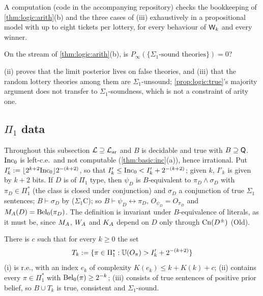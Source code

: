 A computation (code in the accompanying repository) checks the bookkeeping of \cref{thm:logic:arith}(b) and the three cases of (iii) exhaustively in a propositional model with up to eight tickets per lottery, for every behaviour of $\mathsf{W}_{k}$ and every winner.

\begin{question}\label{q:logic:soundtrue}
On the stream of \cref{thm:logic:arith}(b), is $P_\infty(\{\text{$\Sigma_1$-sound theories}\})=0$?
\end{question}

(ii) proves that the limit posterior lives on false theories, and (iii) that the random lottery theories among them are $\Sigma_1$-unsound; \cref{prop:logic:true}'s majority argument does not transfer to $\Sigma_1$-soundness, which is not a constraint of arity one.

\subsection{\texorpdfstring{$\Pi_1$}{Pi1} data}\label{app:logic:pi1}

Throughout this subsection $\mathcal L\supseteq\mathcal{L}_{\mathrm{ar}}$ and $B$ is decidable and true with $B\supseteq\mathsf{Q}$. $\mathrm{Inc}_0$ is left-c.e.\ and not computable (\cref{thm:basic:inc}(a)), hence irrational. Put $I'_k:=\lfloor2^{k+2}\mathrm{Inc}_0\rfloor2^{-(k+2)}$, so that $I'_k\le\mathrm{Inc}_0<I'_k+2^{-(k+2)}$; given $k$, $I'_k$ is given by $k+2$ bits. If $D$ is of $\Pi_1$ type, then $\psi_D$ is $B$-equivalent to $\pi_D\wedge\sigma_D$ with $\pi_D\in\Pi_1^*$ (the class is closed under conjunction) and $\sigma_D$ a conjunction of true $\Sigma_1$ sentences; $B\vdash\sigma_D$ by ($\Sigma_1$C); so $B\vdash\psi_D\leftrightarrow\pi_D$, $O_{\psi_D}=O_{\pi_D}$ and $M_{A}(D)=\mathrm{Bel}_0(\pi_D)$. The definition is invariant under $B$-equivalence of literals, as it must be, since $M_{A}$, $W_{A}$ and $K_{A}$ depend on $D$ only through $\mathrm{Cn}(D^\pm)$ (Old).

\begin{theorem}\label{thm:logic:thresholdtheories}
There is $c$ such that for every $k\ge0$ the set
\[
T_k:=\{\pi\in\Pi_1^*:\mathbb{U}(O_\pi)>I'_k+2^{-(k+2)}\}
\]
(i) is r.e., with an index $e_k$ of complexity $K(e_k)\le k+K(k)+c$; (ii) contains every $\pi\in\Pi_1^*$ with $\mathrm{Bel}_0(\pi)\ge2^{-k}$; (iii) consists of true sentences of positive prior belief, so $B\cup T_k$ is true, consistent and $\Sigma_1$-sound.
\end{theorem}

